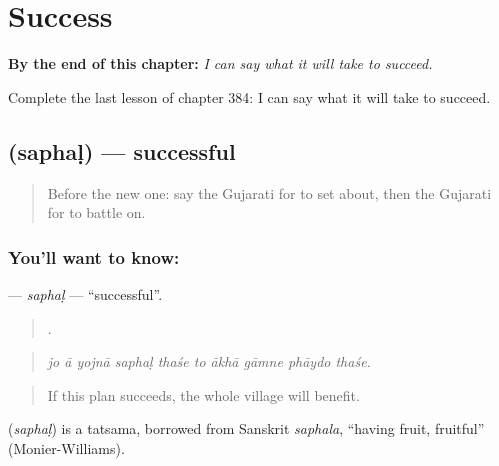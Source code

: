 
\chapter{Success}
\label{ch:gu-success}

\begin{chapteropening}
\textbf{By the end of this chapter:} \emph{I can say what it will take to succeed.}

Complete the last lesson of chapter 384: I can say what it will take to succeed.
\end{chapteropening}

\section[\texorpdfstring{\gu{સફળ} (saphaḷ)}{સફળ (saphaḷ)}]{ (saphaḷ) — successful}

\label{lesson:GU-C384-saphal}



\begin{quote}
Before the new one: say the Gujarati for to set about, then the Gujarati for to battle on.
\end{quote}

\subsection*{You'll want to know: }
\textbf{} — \emph{saphaḷ} — \textquotedblleft{}successful\textquotedblright{}.

\begin{quote}
         .
\end{quote}

\begin{quote}
\emph{jo ā yojnā saphaḷ thaśe to ākhā gāmne phāydo thaśe.}
\end{quote}

\begin{quote}
If this plan succeeds, the whole village will benefit.
\end{quote}

\begin{cousinweb}
\textbf{} (\emph{saphaḷ}) is a tatsama, borrowed from Sanskrit \emph{saphala}, \textquotedblleft{}having fruit, fruitful\textquotedblright{} (Monier-Williams).
\end{cousinweb}

